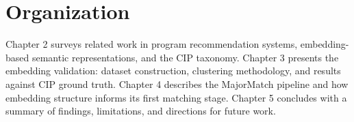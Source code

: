 \section{Organization}

Chapter 2 surveys related work in program recommendation systems, embedding-based semantic representations, and the CIP taxonomy. Chapter 3 presents the embedding validation: dataset construction, clustering methodology, and results against CIP ground truth. Chapter 4 describes the MajorMatch pipeline and how embedding structure informs its first matching stage. Chapter 5 concludes with a summary of findings, limitations, and directions for future work.

\newpage
